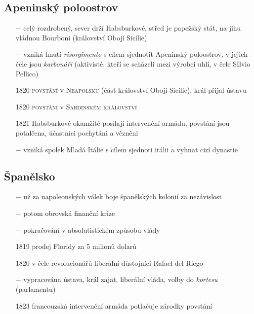 \documentclass{article}
\begin{document}
\subsection*{Apeninský poloostrov}
\begin{itemize}
    \vspace{-0.5em}
    \setlength\itemsep{0.15em}
    \item[$-$] celý rozdrobený, sever drží Habsburkové, střed je papežský stát, na jihu vládnou Bourboni (království Obojí Sicílie)
    \item[$-$] vzniká hnutí \textit{risorgimento} s cílem sjednotit Apeninský poloostrov, v jejich čele jsou \textit{karbonáři} (aktivisté, kteří se scházeli mezi výrobci uhlí, v čele SIlvio Pellico)
    \item[1820] \textsc{povstání v Neapolsku} (část království Obojí Sicílie), král přijal ústavu
    \item[1820] \textsc{povstání v Sardinském království}
    \item[1821] Habsburkové okamžitě posílají intervenční armádu, povstání jsou potalčena, účastníci pochytáni a vězněni
    \item[$-$] vzniká spolek Mladá Itálie s cílem sjednoti itálii a vyhnat cizí dynastie
\end{itemize}

\subsection*{Španělsko}
\begin{itemize}
    \vspace{-0.5em}
    \setlength\itemsep{0.15em}
    \item[$-$] už za napoleonských válek boje španělských kolonií za nezávislost
    \item[$-$] potom obrovská finanční krize
    \item[$-$] pokračování v absolutistickém způsobu vlády
    \item[1819] prodej Floridy za 5 milionů dolarů
    \item[1820] v čele revolucionářů liberální důstojníci Rafael del Riego
    \item[$-$] vypracována ústava, král zajat, liberální vláda, volby do \textit{kortesu} (parlamentu)
    \item[1823] francouzská intervenční armáda potlačuje zárodky povstání
\end{itemize}
\end{document}
